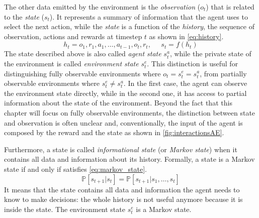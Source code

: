 The other data emitted by the environment is the \textit{observation} ($o_t$) that is related to the \textit{state} ($s_t$).
It represents a summary of information that the agent uses to select the next action, while the \textit{state} is a function of the \textit{history}, the sequence of observation, actions and rewards at timestep $t$ as shown in \vref{eq:history}.
\begin{equation}\label{eq:history}
	h_t = o_1, r_1, a_1, \dots, a_{t-1}, o_{t}, r_t, \;\;\;\;\; s_t = f(h_t)
\end{equation}
The state described above is also called \textit{agent state} $s_t^a$, while the private state of the environment is called \textit{environment state} $s_t^e$.
This distinction is useful for distinguishing fully observable environments where $o_t = s_t^e = s_t^a$, from partially observable environments where $s_t^e \neq s_t^a$.
In the first case, the agent can observe the environment state directly, while in the second one, it has access to partial information about the state of the environment.
Beyond the fact that this chapter will focus on fully observable environments, the distinction between state and observation is often unclear and, conventionally, the input of the agent is composed by the reward and the state as shown in \vref{fig:interactionsAE}.

Furthermore, a state is called \textit{informational state} (or \textit{Markov state}) when it contains all data and information about its history.
Formally, a state is a Markov state if and only if satisfies \vref{eq:markov_state}.
\begin{equation} \label{eq:markov_state}
	\mathbb{P}[s_{t+1}| s_t] = \mathbb{P}[s_{t+1} | s_1, \dots, s_t]
\end{equation}
It means that the state contains all data and information the agent needs to know to make decisions: the whole history is not useful anymore because it is inside the state.
The environment state $s_t^e$ is a Markov state.

